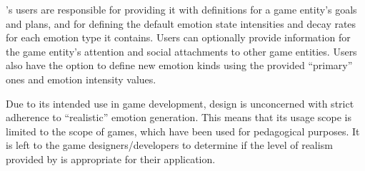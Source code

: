 \progname{}'s users are responsible for providing it with definitions for a
game entity's goals and plans, and for defining the default emotion state
intensities and decay rates for each emotion type it contains. Users can
optionally provide information for the game entity's attention and social
attachments to other game entities. Users also have the option to define new
emotion kinds using the provided ``primary'' ones and emotion intensity values.

Due to its intended use in game development, \progname{} design is unconcerned
with strict adherence to ``realistic'' emotion generation. This means that its
usage scope is limited to the scope of games, which have been used for
pedagogical purposes. It is left to the game designers/developers to determine
if the level of realism provided by \progname{} is appropriate for their
application.